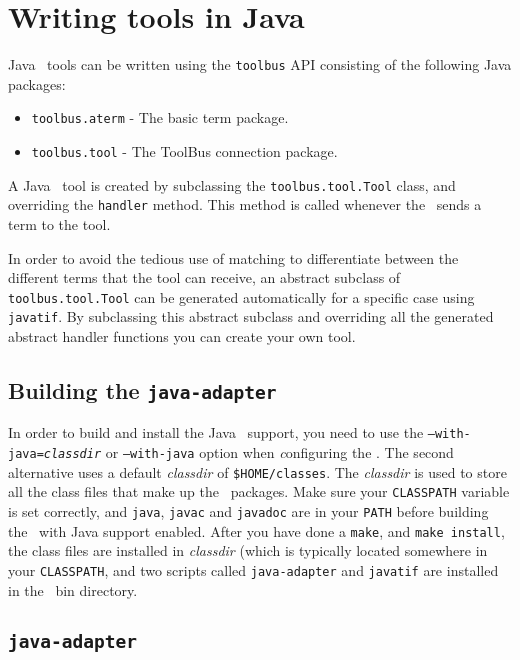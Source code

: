 
\section{\label{ToolsInJava}Writing tools in Java}

Java \TB\ tools can be written using the {\tt toolbus} API
consisting of the following Java packages:

\begin{itemize}
\item {\tt toolbus.aterm} - The basic term package.
\item {\tt toolbus.tool} - The ToolBus connection package.
\end{itemize}

A Java \TB\ tool is created by subclassing the {\tt toolbus.tool.Tool}
class, and overriding the {\tt handler} method. This method is called
whenever the \TB\ sends a term to the tool.

In order to avoid the tedious use of matching to differentiate between
the different terms that the tool can receive, an abstract subclass of 
{\tt toolbus.tool.Tool} can be generated automatically for a specific
case using {\tt javatif}. By subclassing this abstract subclass and
overriding all the generated abstract handler functions you can create
your own tool.

\subsection{Building the {\tt java-adapter}}
In order to build and install the Java \TB\ support, you need to
use the {\tt --with-java=\emph{classdir}} or {\tt --with-java} option
when {\emph configuring} the \TB. The second alternative uses a
default \emph{classdir} of {\tt \$HOME/classes}. The \emph{classdir}
is used to store all the class files that make up the \TB\ packages.
Make sure your {\tt CLASSPATH} variable is set correctly, and {\tt java},
{\tt javac} and {\tt javadoc} are in your {\tt PATH} before building the
\TB\ with Java support enabled. After you have done a {\tt make}, and 
{\tt make install}, the class files are installed in \emph{classdir} (which
is typically located somewhere in your {\tt CLASSPATH}, and two scripts called 
{\tt java-adapter} and {\tt javatif} are installed in the \TB\ bin directory.

\subsection{\label{java-adapter}{\tt java-adapter}}

